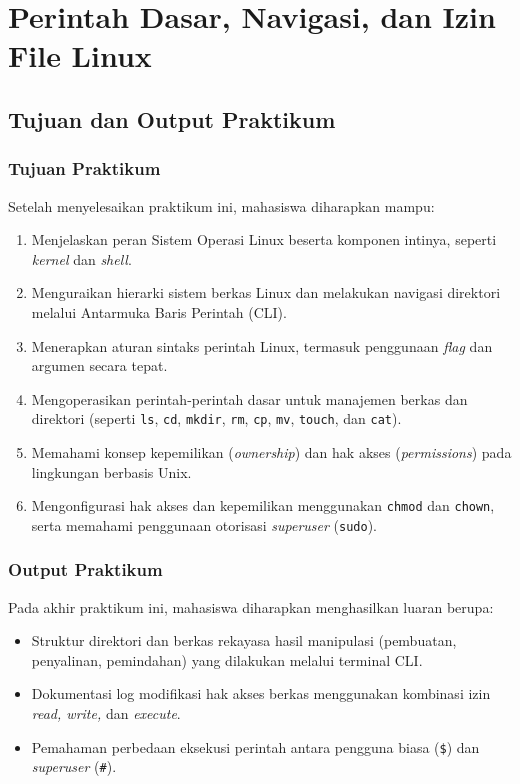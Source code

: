
\chapter{Perintah Dasar, Navigasi, dan Izin File Linux}
\label{chap:modul-03}

\section{Tujuan dan Output Praktikum}

\subsection{Tujuan Praktikum}
Setelah menyelesaikan praktikum ini, mahasiswa diharapkan mampu:
\begin{enumerate}
    \item Menjelaskan peran Sistem Operasi Linux beserta komponen intinya, seperti \textit{kernel} dan \textit{shell}.
    \item Menguraikan hierarki sistem berkas Linux dan melakukan navigasi direktori melalui Antarmuka Baris Perintah (CLI).
    \item Menerapkan aturan sintaks perintah Linux, termasuk penggunaan \textit{flag} dan argumen secara tepat.
    \item Mengoperasikan perintah-perintah dasar untuk manajemen berkas dan direktori (seperti \texttt{ls}, \texttt{cd}, \texttt{mkdir}, \texttt{rm}, \texttt{cp}, \texttt{mv}, \texttt{touch}, dan \texttt{cat}).
    \item Memahami konsep kepemilikan (\textit{ownership}) dan hak akses (\textit{permissions}) pada lingkungan berbasis Unix.
    \item Mengonfigurasi hak akses dan kepemilikan menggunakan \texttt{chmod} dan \texttt{chown}, serta memahami penggunaan otorisasi \textit{superuser} (\texttt{sudo}).
\end{enumerate}

\subsection{Output Praktikum}
Pada akhir praktikum ini, mahasiswa diharapkan menghasilkan luaran berupa:
\begin{itemize}
    \item Struktur direktori dan berkas rekayasa hasil manipulasi (pembuatan, penyalinan, pemindahan) yang dilakukan melalui terminal CLI.
    \item Dokumentasi log modifikasi hak akses berkas menggunakan kombinasi izin \textit{read, write,} dan \textit{execute}.
    \item Pemahaman perbedaan eksekusi perintah antara pengguna biasa (\texttt{\$}) dan \textit{superuser} (\texttt{\#}).
\end{itemize}

